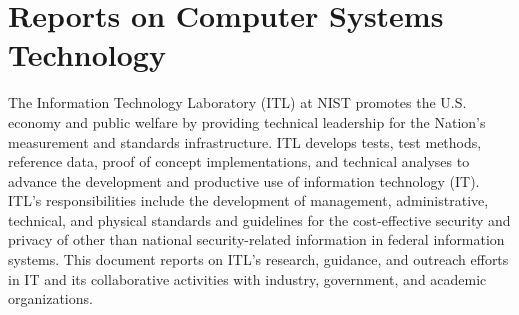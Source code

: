\section*{\hfill Reports on Computer Systems Technology \hfill}

The Information Technology Laboratory (ITL) at NIST promotes the
U.S. economy and public welfare by providing technical leadership for
the Nation's measurement and standards infrastructure. ITL develops
tests, test methods, reference data, proof of concept implementations,
and technical analyses to advance the development and productive use
of information technology (IT). ITL's responsibilities include the
development of management, administrative, technical, and physical
standards and guidelines for the cost-effective security and privacy
of other than national security-related information in federal
information systems. This document reports on ITL's research,
guidance, and outreach efforts in IT and its collaborative activities
with industry, government, and academic organizations.

